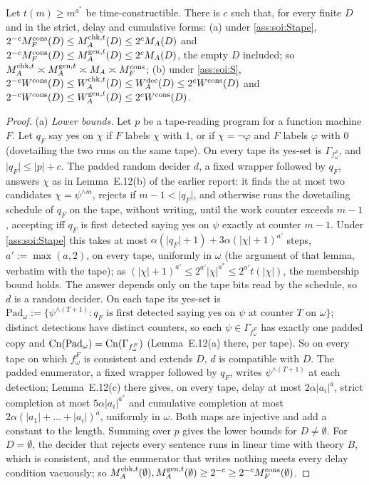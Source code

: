 \begin{theorem}\label{thm:soi:penalty}
Let $t(m)\ge m^{a^*}$ be time-constructible. There is $c$ such that, for every finite $D$ and in the strict, delay and cumulative forms:
(a) under \cref{ass:soi:Stape}, $2^{-c}M_{F}^{\mathrm{cons}}(D)\le M_{A}^{\mathrm{chk},t}(D)\le2^cM_{A}(D)$ and $2^{-c}M_{F}^{\mathrm{cons}}(D)\le M_{A}^{\mathrm{gen},t}(D)\le2^cM_{A}(D)$, the empty $D$ included; so $M_{A}^{\mathrm{chk},t}\asymp M_{A}^{\mathrm{gen},t}\asymp M_{A}\asymp M_{F}^{\mathrm{cons}}$;
(b) under \cref{ass:soi:S}, $2^{-c}W^{\mathrm{cons}}(D)\le W_{A}^{\mathrm{chk},t}(D)\le W_{A}^{\mathrm{dec}}(D)\le2^cW^{\mathrm{cons}}(D)$ and $2^{-c}W^{\mathrm{cons}}(D)\le W_{A}^{\mathrm{gen},t}(D)\le2^cW^{\mathrm{cons}}(D)$.
\end{theorem}

\begin{proof}
(a) \emph{Lower bounds.} Let $p$ be a tape-reading program for a function machine $F$. Let $q_F$ say yes on $\chi$ if $F$ labels $\chi$ with $1$, or if $\chi=\neg\varphi$ and $F$ labels $\varphi$ with $0$ (dovetailing the two runs on the same tape). On every tape its yes-set is $\Gamma_{f^F_\omega}$, and $\lvert q_F\rvert\le\lvert p\rvert+c$. The padded random decider $d$, a fixed wrapper followed by $q_F$, answers $\chi$ as in Lemma~E.12(b) of the earlier report: it finds the at most two candidates $\chi=\psi^{\wedge m}$, rejects if $m-1<\lvert q_F\rvert$, and otherwise runs the dovetailing schedule of $q_F$ on the tape, without writing, until the work counter exceeds $m-1$, accepting iff $q_F$ is first detected saying yes on $\psi$ exactly at counter $m-1$. Under \cref{ass:soi:Stape} this takes at most $\alpha(\lvert q_F\rvert+1)+3\alpha(\lvert\chi\rvert+1)^{a'}$ steps, $a':=\max(a,2)$, on every tape, uniformly in $\omega$ (the argument of that lemma, verbatim with the tape); as $(\lvert\chi\rvert+1)^{a'}\le2^{a'}\lvert\chi\rvert^{a^*}\le2^{a'}t(\lvert\chi\rvert)$, the membership bound holds. The answer depends only on the tape bits read by the schedule, so $d$ is a random decider. On each tape its yes-set is $\mathrm{Pad}_\omega:=\{\psi^{\wedge(T+1)}:q_F\text{ is first detected saying yes on }\psi\text{ at counter }T\text{ on }\omega\}$; distinct detections have distinct counters, so each $\psi\in\Gamma_{f^F_\omega}$ has exactly one padded copy and $\mathrm{Cn}(\mathrm{Pad}_\omega)=\mathrm{Cn}(\Gamma_{f^F_\omega})$ (Lemma~E.12(a) there, per tape). So on every tape on which $f^F_\omega$ is consistent and extends $D$, $d$ is compatible with $D$. The padded enumerator, a fixed wrapper followed by $q_F$, writes $\psi^{\wedge(T+1)}$ at each detection; Lemma~E.12(c) there gives, on every tape, delay at most $2\alpha\lvert a_i\rvert^a$, strict completion at most $5\alpha\lvert a_i\rvert^{a^*}$ and cumulative completion at most $2\alpha(\lvert a_1\rvert+\dots+\lvert a_i\rvert)^a$, uniformly in $\omega$. Both maps are injective and add a constant to the length. Summing over $p$ gives the lower bounds for $D\ne\emptyset$. For $D=\emptyset$, the decider that rejects every sentence runs in linear time with theory $B$, which is consistent, and the enumerator that writes nothing meets every delay condition vacuously; so $M_{A}^{\mathrm{chk},t}(\emptyset),M_{A}^{\mathrm{gen},t}(\emptyset)\ge2^{-c}\ge2^{-c}M_{F}^{\mathrm{cons}}(\emptyset)$.

\end{proof}
